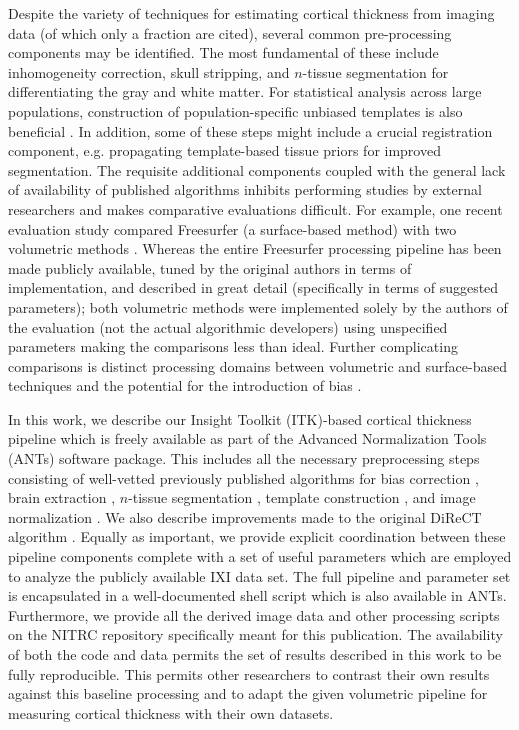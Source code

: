 Despite the variety of techniques for estimating cortical thickness
from imaging data (of which
only a fraction are cited), several common pre-processing components
may be identified.
The most fundamental of these include inhomogeneity correction, skull stripping, and $n$-tissue segmentation 
for differentiating the gray and white matter.  For statistical analysis 
across large populations, construction of population-specific unbiased templates
is also beneficial \cite{evans2012}.
In addition, some of these steps might include a crucial registration component, e.g. 
propagating template-based tissue priors for improved segmentation.  The requisite
additional components coupled with the general lack of availability of published
algorithms \cite{kovacevic2006} inhibits performing studies by external researchers 
and makes comparative evaluations difficult.  For example, one recent evaluation 
study \citep{clarkson2011} compared
Freesurfer (a surface-based method) with two volumetric methods \citep{jones2000,das2009}.
Whereas the entire Freesurfer processing pipeline has been made publicly available, 
tuned by the original authors in terms of implementation, and described in great detail 
(specifically in terms of suggested parameters); both volumetric methods were 
implemented solely by the authors of the evaluation (not the actual algorithmic developers) using 
unspecified parameters making the comparisons less than
ideal. Further complicating comparisons is distinct processing domains between
volumetric and surface-based techniques and the potential for the introduction
of bias \cite{klein2010}.

In this work, we describe our Insight Toolkit (ITK)-based cortical thickness pipeline
which is freely available as part of the Advanced Normalization Tools
(ANTs) software package.  This includes all the necessary preprocessing steps consisting
of well-vetted previously published algorithms for bias correction \cite{tustison2010},
brain extraction \cite{avants2010a}, $n$-tissue segmentation \cite{avants2011a},
template construction \cite{avants2010}, and image normalization \cite{avants2011}.
We also describe improvements made to the original DiReCT algorithm \cite{das2009}.
Equally as important, we provide explicit coordination between
these pipeline components complete with a set of useful parameters
which are employed to analyze the publicly available IXI data set. The
full pipeline and parameter set is 
encapsulated in a well-documented shell script which is also available in ANTs. 
Furthermore, we provide all the derived image data and other processing scripts on 
the NITRC repository specifically meant for this publication.  The
availability of both the code and data permits
the set of results described in this work to be fully reproducible.  This
permits other researchers to contrast their own results against
this baseline processing and to adapt the given volumetric pipeline for measuring
cortical thickness with their own datasets.








